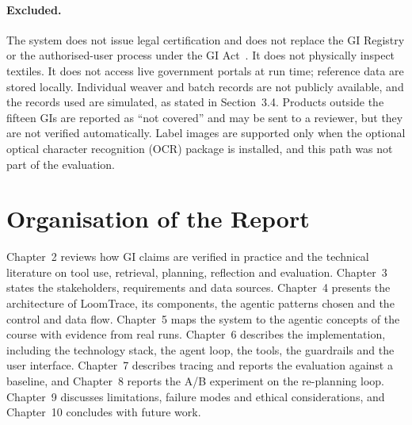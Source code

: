 \paragraph{Excluded.} The system does not issue legal certification and does not replace the GI
Registry or the authorised-user process under the GI Act~\cite{giact1999}. It does not physically
inspect textiles. It does not access live government portals at run time; reference data are stored
locally. Individual weaver and batch records are not publicly available, and the records used are
simulated, as stated in Section~3.4. Products outside the fifteen GIs are reported as ``not covered''
and may be sent to a reviewer, but they are not verified automatically. Label images are supported
only when the optional optical character recognition (OCR) package is installed, and this path was not
part of the evaluation.

\section{Organisation of the Report}

Chapter~2 reviews how GI claims are verified in practice and the technical literature on tool use,
retrieval, planning, reflection and evaluation. Chapter~3 states the stakeholders, requirements and
data sources. Chapter~4 presents the architecture of LoomTrace, its components, the agentic patterns
chosen and the control and data flow. Chapter~5 maps the system to the agentic concepts of the course
with evidence from real runs. Chapter~6 describes the implementation, including the technology stack,
the agent loop, the tools, the guardrails and the user interface. Chapter~7 describes tracing and
reports the evaluation against a baseline, and Chapter~8 reports the A/B experiment on the re-planning
loop. Chapter~9 discusses limitations, failure modes and ethical considerations, and Chapter~10
concludes with future work.
